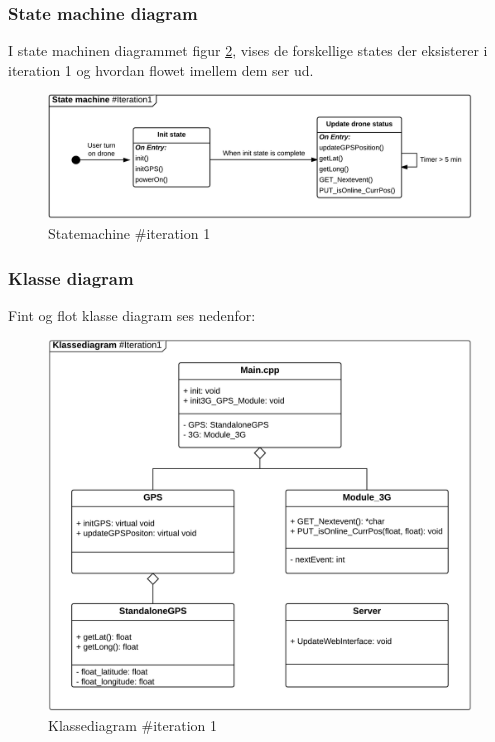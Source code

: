 \newpage
\subsubsection*{State machine diagram}
I state machinen diagrammet figur \ref{fig:Statemachine_iteration1}, vises de forskellige states der eksisterer i iteration 1 og hvordan flowet imellem dem ser ud.
\begin{figure}[H]
	\centering
	\includegraphics[width=1\textwidth]{Billeder/statemachine/State_iteration1.png}
	\vspace{-0.5cm}
	\caption{Statemachine \#iteration 1}
	\label{fig:Statemachine_iteration1}
\end{figure}

\subsubsection*{Klasse diagram}
Fint og flot klasse diagram ses nedenfor:
\begin{figure}[H]
	\centering
	\includegraphics[width=1\textwidth]{Billeder/klasse_diagrammer/classdiagram_iteration1.png}
	\vspace{-0.5cm}
	\caption{Klassediagram \#iteration 1}
	\label{fig:Statemachine_iteration1}
\end{figure}

